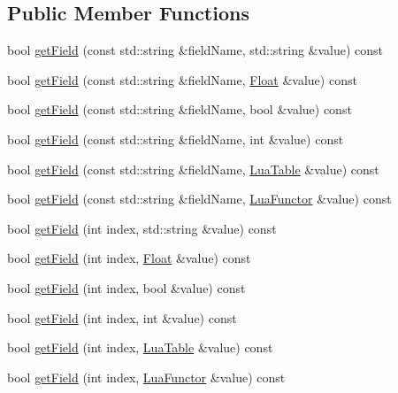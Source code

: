 \subsection*{Public Member Functions}
\begin{DoxyCompactItemize}
\item 
bool \hyperlink{classZeta_1_1LuaTable_af8dd387feb91dd1cf8b1914158db9978}{get\+Field} (const std\+::string \&field\+Name, std\+::string \&value) const 
\item 
bool \hyperlink{classZeta_1_1LuaTable_acd9742e11993874cb4b228aa98cc7c98}{get\+Field} (const std\+::string \&field\+Name, \hyperlink{namespaceZeta_a1e0a1265f9b3bd3075fb0fabd39088ba}{Float} \&value) const 
\item 
bool \hyperlink{classZeta_1_1LuaTable_a9f552444d5a1c3a5f38d21cd2fc7301a}{get\+Field} (const std\+::string \&field\+Name, bool \&value) const 
\item 
bool \hyperlink{classZeta_1_1LuaTable_af768a3ce187111d392b3ee408b9aa516}{get\+Field} (const std\+::string \&field\+Name, int \&value) const 
\item 
bool \hyperlink{classZeta_1_1LuaTable_a89fb7b32813ce3b7744343c0a12088d0}{get\+Field} (const std\+::string \&field\+Name, \hyperlink{classZeta_1_1LuaTable}{Lua\+Table} \&value) const 
\item 
bool \hyperlink{classZeta_1_1LuaTable_a9f3a5fed7812bf30d0e1600244e29deb}{get\+Field} (const std\+::string \&field\+Name, \hyperlink{classZeta_1_1LuaFunctor}{Lua\+Functor} \&value) const 
\item 
bool \hyperlink{classZeta_1_1LuaTable_aa351b953f20deab59361ab9e5d54c926}{get\+Field} (int index, std\+::string \&value) const 
\item 
bool \hyperlink{classZeta_1_1LuaTable_acf034ca97dd8fcbf3b2753b34d9df522}{get\+Field} (int index, \hyperlink{namespaceZeta_a1e0a1265f9b3bd3075fb0fabd39088ba}{Float} \&value) const 
\item 
bool \hyperlink{classZeta_1_1LuaTable_abc7efc6d6e6d594e575dffaaa465c30e}{get\+Field} (int index, bool \&value) const 
\item 
bool \hyperlink{classZeta_1_1LuaTable_af0deadd5e9a6755fcb372ca63660d83c}{get\+Field} (int index, int \&value) const 
\item 
bool \hyperlink{classZeta_1_1LuaTable_aa14aaa851d56d0b044592e7e8e4d052e}{get\+Field} (int index, \hyperlink{classZeta_1_1LuaTable}{Lua\+Table} \&value) const 
\item 
bool \hyperlink{classZeta_1_1LuaTable_a866ea58f1c89657f4f7a14d28462aa69}{get\+Field} (int index, \hyperlink{classZeta_1_1LuaFunctor}{Lua\+Functor} \&value) const 

\end{DoxyCompactItemize}
